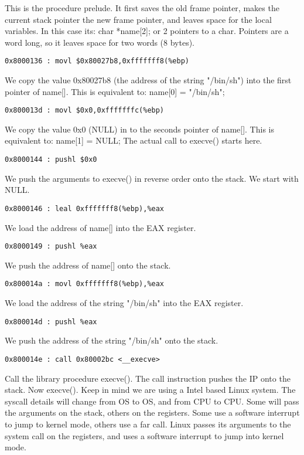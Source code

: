 \documentclass[10pt]{article}
\begin{document}
\begin{CJK}{UTF8}{bsmi}
This is the procedure prelude. It first saves the old frame pointer, makes the current stack pointer the new frame 
pointer, and leaves space for the local variables. In this case its: char *name[2]; or 2 pointers to a char. Pointers 
are a word long, so it leaves space for two words (8 bytes).

\begin{verbatim}
0x8000136 : movl $0x80027b8,0xfffffff8(%ebp)
\end{verbatim}

We copy the value 0x80027b8 (the address of the string "/bin/sh") into the first pointer of name[]. This is 
equivalent to: name[0] = "/bin/sh";

\begin{verbatim}
0x800013d : movl $0x0,0xfffffffc(%ebp)
\end{verbatim}

We copy the value 0x0 (NULL) in to the seconds pointer of name[].  This is equivalent to:
name[1] = NULL;
The actual call to execve() starts here.

\begin{verbatim}
0x8000144 : pushl $0x0
\end{verbatim}

We push the arguments to execve() in reverse order onto the stack. We start with NULL.

\begin{verbatim}
0x8000146 : leal 0xfffffff8(%ebp),%eax
\end{verbatim}

We load the address of name[] into the EAX register.
\begin{verbatim}
0x8000149 : pushl %eax 
\end{verbatim}
We push the address of name[]  onto the stack.
\begin{verbatim}
0x800014a : movl 0xfffffff8(%ebp),%eax
\end{verbatim}
We load the address of the string "/bin/sh" into the EAX register.
\begin{verbatim}
0x800014d : pushl %eax 
\end{verbatim}
We push the address of the string "/bin/sh" onto the stack.
\begin{verbatim}
0x800014e : call 0x80002bc <__execve>
\end{verbatim}
Call the library procedure execve(). The call instruction pushes the IP onto the stack.
Now execve(). Keep in mind we are using a Intel based Linux system. The syscall details will change from OS 
to OS, and from CPU to CPU. Some will pass the arguments on the stack, others on the registers. Some use a 
software interrupt to jump to kernel mode, others use a far call. Linux passes its arguments to the system call on 
the registers, and uses a software interrupt to jump into kernel mode.


\end{CJK}
\end{document}
